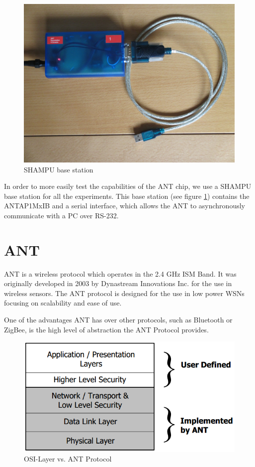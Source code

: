 \begin{figure}[H]
	\centering
	\includegraphics[scale=.5]{./pics/SHAMPUbase.JPG}
	\caption{SHAMPU base station}\label{fig:shampubase}
\end{figure}
In order to more easily test the capabilities of the ANT chip, we use a SHAMPU base station for all the experiments. This base station (see figure \ref{fig:shampubase}) contains the ANTAP1MxIB and a serial interface, which allows the ANT to asynchronously communicate with a PC over RS-232. 

\section{ANT}
ANT \cite{DynastreamInnovationsInc.2013} is a wireless protocol which operates in the 2.4 GHz ISM Band. It was originally developed in 2003 by Dynastream Innovations Inc. for the use in wireless sensors. The ANT protocol is designed for the use in low power WSNs focusing on scalability and ease of use.

One of the advantages ANT has over other protocols, such as Bluetooth or ZigBee, is the high level of abstraction the ANT Protocol provides. 
\begin{figure}[H]
	\centering
	\includegraphics[scale=.5]{./pics/ANTstack.png}
	\caption{OSI-Layer vs. ANT Protocol\cite{Networks}}\label{fig:osilayer}
\end{figure}

